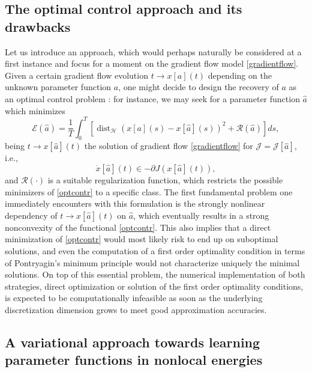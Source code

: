 \documentclass[A4paper,11pt]{article}
\theoremstyle{definition}
\begin{document}
\subsection{The optimal control approach and its drawbacks}
Let us introduce an approach, which would perhaps naturally be considered at a first instance and focus for a moment on the gradient flow model \eqref{gradientflow}. Given a certain gradient flow evolution $t \to x[a](t)$ depending on the unknown parameter function $a$, one might decide to design the recovery of $a$ as an optimal control problem \cite{brpi07}: for instance, we may seek for a parameter function $\hat a$ which minimizes
\begin{equation}\label{optcontr}
\mathcal E(\hat a) = \frac{1}{T}\int_0^T \left [ \operatorname{dist}_{\mathcal H}(x[a](s) - x[\hat a](s))^2 + \mathcal R(\hat a) \right ] d s ,
\end{equation}
being $t \to x[\hat a](t)$ the solution of gradient flow \eqref{gradientflow} for $\mathcal J = \mathcal J[\hat a]$, i.e.,
\begin{equation}\label{gradientflow2}
\dot x[\hat a](t) \in - \partial J(x[\hat a](t)),
\end{equation}
and $\mathcal R(\cdot)$ is a suitable regularization function, which restricts the possible minimizers of \eqref{optcontr} to a specific class. The first fundamental problem one immediately encounters with this formulation is the strongly nonlinear dependency of $t \to x[\hat a](t)$ on $\hat a$, which eventually results in a strong nonconvexity of the functional \eqref{optcontr}. This also implies that a direct minimization of \eqref{optcontr} would most likely risk to end up on suboptimal solutions, and even the computation of a first order optimality condition in terms of Pontryagin's minimum principle would not characterize uniquely the minimal solutions. On top of this essential problem, the numerical implementation of both strategies, direct optimization or solution of the first order optimality conditions, is expected to be computationally infeasible as soon as the underlying discretization dimension grows to meet good approximation accuracies.

\subsection{A variational approach towards learning parameter functions in nonlocal energies}\label{sec:wp2}
\end{document}
